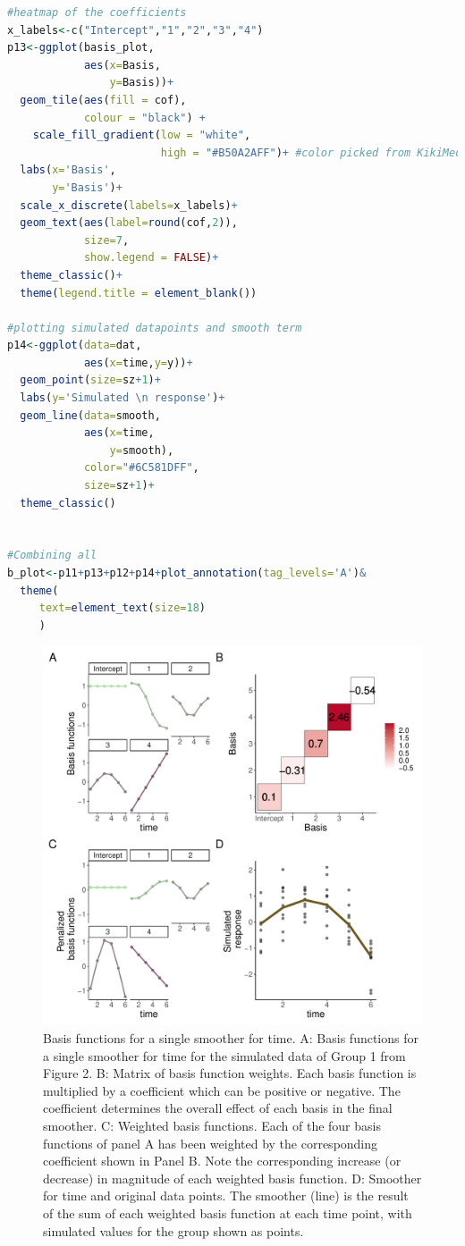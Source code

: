 \documentclass[
]{article}
\begin{document}
\begin{lstlisting}[language=R]
#heatmap of the coefficients
x_labels<-c("Intercept","1","2","3","4")
p13<-ggplot(basis_plot,
            aes(x=Basis,
                y=Basis))+
  geom_tile(aes(fill = cof), 
            colour = "black") +
    scale_fill_gradient(low = "white",
                        high = "#B50A2AFF")+ #color picked from KikiMedium
  labs(x='Basis',
       y='Basis')+
  scale_x_discrete(labels=x_labels)+
  geom_text(aes(label=round(cof,2)),
            size=7,
            show.legend = FALSE)+
  theme_classic()+
  theme(legend.title = element_blank())
  
#plotting simulated datapoints and smooth term
p14<-ggplot(data=dat,
            aes(x=time,y=y))+
  geom_point(size=sz+1)+
  labs(y='Simulated \n response')+
  geom_line(data=smooth,
            aes(x=time,
                y=smooth),
            color="#6C581DFF",
            size=sz+1)+
  theme_classic()
  

#Combining all
b_plot<-p11+p13+p12+p14+plot_annotation(tag_levels='A')&
  theme(
     text=element_text(size=18)
     )
\end{lstlisting}

\begin{figure}

{\centering \includegraphics[width=0.75\linewidth]{SIM_Appendix_files/figure-latex/basis-plot-appendix-1} 

}

\caption{Basis functions for a single smoother for time. A: Basis functions for a single smoother for time for the simulated data of Group 1 from Figure 2. B: Matrix of basis function weights. Each basis function is multiplied by a coefficient which can be positive or negative. The coefficient determines the overall effect of each basis in the final smoother. C: Weighted basis functions. Each of the four basis functions of panel A has been weighted by the corresponding coefficient shown in Panel B. Note the corresponding increase (or decrease) in magnitude of each weighted basis function. D: Smoother for time and original data points. The smoother (line) is the result of the sum of each weighted basis function at each time point, with simulated values for the group shown as points.}\label{fig:basis-plot-appendix}
\end{figure}
\end{document}

